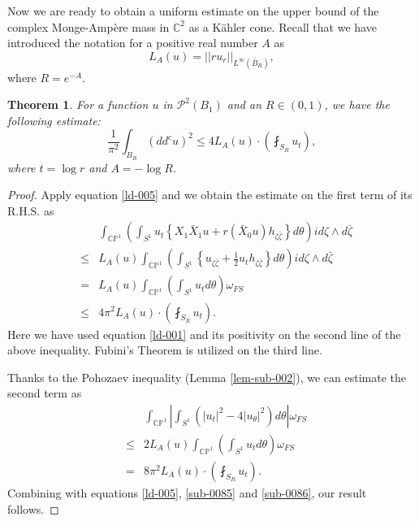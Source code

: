 \documentclass[a4paper,11pt]{amsart}
\numberwithin{equation}{section}
\newtheorem{theorem}{Theorem}[section]
\def\cP{{\mathcal P}}
\def\cP{{\mathcal P}}
\let\ol=\overline
\def\bC{{\mathbb C}}
\def\bP{{\mathbb P}}
\def\z{{\zeta}}
\begin{document}
Now we are ready to obtain 
a uniform estimate  on the 
upper bound of the complex Monge-Amp\`ere mass in $\bC^2$ as a K\"ahler cone.
Recall that we have introduced the notation for a positive real number $A$ as 
$$L_A(u) =  || ru_r ||_{L^{\infty}(\ol{B}_R)}, $$
where $R = e^{-A}$. 
\begin{theorem}
\label{thm-mt-000}
For a function $u$ in $\cP^{2}(B_1)$ and an $R\in (0,1)$, 
we have the following estimate: 
\begin{equation}
\label{sub-0081}
\frac{1}{\pi^2}\int_{B_R} (dd^c u)^2 \leq 4 L_A(u)\cdot \left( \fint_{S_R} u_t \right), 
\end{equation}
where $t=\log r $ and  $A= -\log R$. 
\end{theorem}
\begin{proof}
Apply equation \eqref{ld-005} and we obtain the estimate on the first term of its R.H.S. as  
\begin{eqnarray}
\label{sub-0085}
&& \int_{\bC\bP^1} \left( \int_{S^1} u_{t} \left\{ X_1 \bar X_1 u +  r(\bar X_0 u) h_{\z\bar\z} \right\} d\theta \right) i d\z \wedge d\bar\z
\nonumber\\
&\leq&  L_A(u) \int_{\bC\bP^1} 
\left( \int_{S^1} \left\{ u_{ \z\bar\z} + \frac{1}{2} u_{ t} h_{\z\bar\z}  \right\} d\theta \right) i d\z \wedge d\bar\z
\nonumber\\
&=&  L_A(u) \int_{\bC\bP^1} \left( \int_{S^1} u_{ t} d\theta \right) \omega_{FS}
\nonumber\\
&\leq&  4\pi^2 L_A(u) \cdot  \left( \fint_{S_R} u_t \right). 
\end{eqnarray}
Here we have used  
equation \eqref{ld-001} and its positivity on the second line of the above inequality. 
Fubini's Theorem is utilized on the third line. 

Thanks to the Pohozaev inequality (Lemma \ref{lem-sub-002}), 
we can estimate the second term as 
\begin{eqnarray}
\label{sub-0086}
&&\int_{\bC\bP^1} \left| \int_{S^1} \left( |u_t|^2 - 4 | u_{\theta}|^2 \right) d\theta\right| \omega_{FS} 
\nonumber\\
&\leq& 2 L_A(u)  \int_{\bC\bP^1} \left( \int_{S^1} u_{ t} d\theta \right) \omega_{FS}
\nonumber\\
& = & 8\pi^2 L_A(u) \cdot  \left( \fint_{S_R} u_t \right). 
\end{eqnarray}
Combining with equations \eqref{ld-005}, \eqref{sub-0085} and \eqref{sub-0086}, 
our result follows. 

\end{proof}
\end{document}
